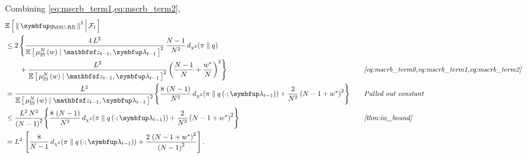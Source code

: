 \begin{proofEnd}
Combining \cref{eq:mscrb_term1,eq:mscrb_term2},
\begin{alignat}{2}
  &\E{\norm{ \vg_{\text{MSC-RB}}}^2 \,\middle|\, \mathcal{F}_t }
  \nonumber
  \\
  &\leq
  2\,\Bigg\{
  \frac{4\,L^2}{\E{ \mu^{N}_{\mathrm{IS}}\left(w\right) \mid \rvvz_{t-1}, \vlambda_{t-1} }^2}
  \,
  \frac{N-1}{N^2}\,
  \DChi{\pi}{q}
  \nonumber
  \\
  &\quad\quad+
  \frac{
    L^2
  }{
    \E{ \mu^{N}_{\mathrm{IS}}\left(w\right) \mid \rvvz_{t-1}, \vlambda_{t-1} }^2
  }\,
  {\left(\frac{N - 1}{N} + \frac{w^*}{N}\right)}^2
  \Bigg\}
  \nonumber
  &&\quad\text{\textit{\cref{eq:mscrb_term0,eq:mscrb_term1,eq:mscrb_term2}}}
  \\
  &=
  \frac{L^2}{\E{ \mu^{N}_{\mathrm{IS}}\left(w\right) \mid \rvvz_{t-1}, \vlambda_{t-1} }^2}
  \Bigg\{
  \frac{8\,\left(N-1\right)}{N^2} \, \DChi{\pi}{q\left(\cdot; \vlambda_{t-1}\right)}
  +
  \frac{2}{N^2}\,{\left(N - 1 + w^*\right)}^2
  \Bigg\}
  &&\quad\text{\textit{Pulled out constant}}
  \nonumber
  \\
  &\leq
  \frac{L^2\,N^2}{{\left(N - 1\right)}^2}
  \Bigg\{
  \frac{8\,\left(N-1\right)}{N^2} \, \DChi{\pi}{q\left(\cdot; \vlambda_{t-1}\right)}
  +
  \frac{2}{N^2}\,{\left(N - 1 + w^*\right)}^2
  \Bigg\}
  &&\quad\text{\textit{\cref{thm:iw_bound}}}
  \nonumber
  \\
  &=
  L^2 \, \left[
    \frac{8}{N-1}\,\DChi{\pi}{q\left(\cdot; \vlambda_{t-1}\right)}
    +
    \frac{{2\,\left(N - 1 + w^*\right)}^2}{{\left(N - 1\right)}^2}
  \right].
  \nonumber
\end{alignat}
\end{proofEnd}


